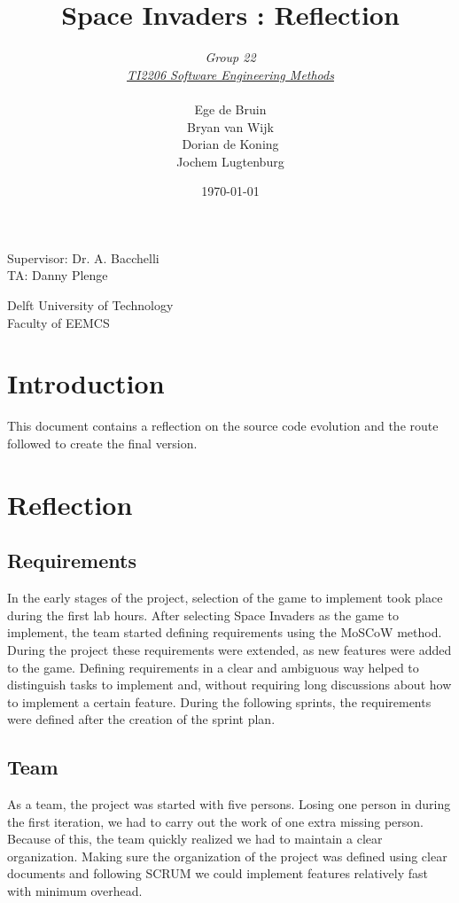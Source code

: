 \documentclass[10pt]{article}
\begin{document}
\title{Space Invaders : Reflection}
\date{\today}
\author{\textit{Group 22}\\ \textit{\underline{TI2206 Software Engineering Methods}} \\
 \\Ege de Bruin \\ Bryan van Wijk \\ Dorian de Koning \\ Jochem Lugtenburg }
 \maketitle  
 \begin{center}
Supervisor: Dr. A. Bacchelli\\
TA: Danny Plenge\\
 \end{center}     
 \begin{center}
 Delft University of Technology\\
 Faculty of EEMCS\\
 \end{center}
 \thispagestyle{empty}
 \pagebreak

\section*{Introduction}
This document contains a reflection on the source code evolution and the route followed to create the final version.

\newpage
\section*{Reflection}
\subsection*{Requirements}
In the early stages of the project, selection of the game to implement took place during the first lab hours. After selecting Space Invaders as the game to implement, the team started defining requirements using the MoSCoW method. During the project these requirements were extended, as new features were added to the game. Defining requirements in a clear and ambiguous way helped to distinguish tasks to implement and, without requiring long discussions about how to implement a certain feature. During the following sprints, the requirements were defined after the creation of the sprint plan.

\subsection*{Team}
As a team, the project was started with five persons. Losing one person in during the first iteration, we had to carry out the work of one extra missing person. Because of this, the team quickly realized we had to maintain a clear organization. Making sure the organization of the project was defined using clear documents and following SCRUM we could implement features relatively fast with minimum overhead.
\end{document}
